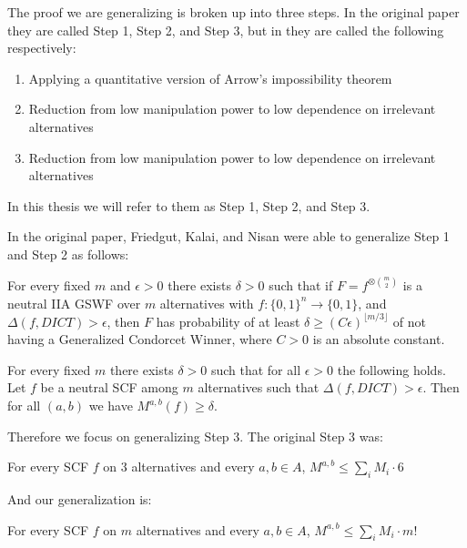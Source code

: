 	The proof we are generalizing is broken up into three steps. In the original paper they are called Step 1, Step 2, and Step 3, but in \cite{friedgut2011quantitative} they are called the following respectively:
	\begin{enumerate}
		\item Applying a quantitative version of Arrow's impossibility theorem
		\item Reduction from low manipulation power to low dependence on irrelevant alternatives
		\item Reduction from low manipulation power to low dependence on irrelevant alternatives
	\end{enumerate}
	In this thesis we will refer to them as Step 1, Step 2, and Step 3.

	In the original paper, Friedgut, Kalai, and Nisan were able to generalize Step 1 and Step 2 as follows:

	\begin{lemma}
		For every fixed $m$ and $\epsilon > 0$ there exists $\delta > 0$ such that if $F = f^{\otimes \binom{m}{2}}$ is a neutral IIA GSWF over $m$ alternatives with $f : \{0,1\}^n \rightarrow \{0,1\}$, and $\Delta(f, DICT) > \epsilon$, then $F$ has probability of at least $\delta \ge (C\epsilon)^{\lfloor m/3 \rfloor}$ of not having a Generalized Condorcet Winner, where $C > 0$ is an absolute constant.
	\end{lemma}

	\begin{lemma}
		For every fixed $m$ there exists $\delta > 0$ such that for all $\epsilon > 0$ the following holds. Let $f$ be a neutral SCF among $m$ alternatives such that $\Delta(f, DICT) > \epsilon$. Then for all $(a,b)$ we have $M^{a,b}(f) \ge \delta$.
	\end{lemma}

	Therefore we focus on generalizing Step 3. The original Step 3 was:

	\begin{lemma}
		For every SCF $f$ on $3$ alternatives and every $a,b \in A$, $M^{a,b} \le \sum_i M_i \cdot 6$
	\end{lemma}

	And our generalization is:

	\begin{lemma}
		For every SCF $f$ on $m$ alternatives and every $a,b \in A$, $M^{a,b} \le \sum_i M_i \cdot m!$
	\end{lemma}

